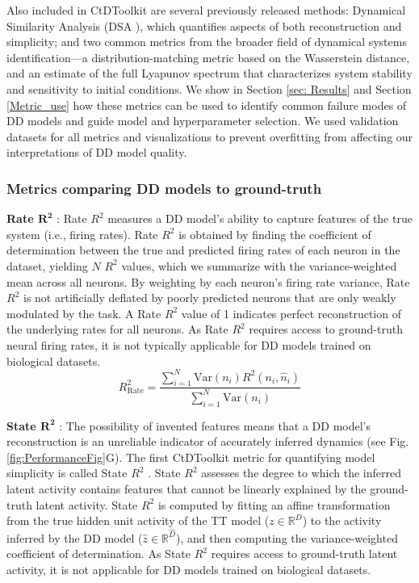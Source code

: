 \documentclass{article}
\begin{document}
Also included in CtDToolkit are several previously released methods: Dynamical Similarity Analysis (DSA \cite{ostrow_dsa}), which quantifies aspects of both reconstruction and simplicity; and two common metrics from the broader field of dynamical systems identification—a distribution-matching metric based on the Wasserstein distance, and an estimate of the full Lyapunov spectrum that characterizes system stability and sensitivity to initial conditions. We show in Section \ref{sec: Results} and Section \ref{Metric_use} how these metrics can be used to identify common failure modes of DD models and guide model and hyperparameter selection. We used validation datasets for all metrics and visualizations to prevent overfitting from affecting our interpretations of DD model quality.

\subsubsection{Metrics comparing DD models to ground-truth \label{section:GTMetrics}}
\textbf{Rate $\boldsymbol{R^2}$} :
Rate $R^2$ measures a DD model's ability to capture features of the true system (i.e., firing rates). Rate $R^2$ is obtained by finding the coefficient of determination between the true and predicted firing rates of each neuron in the dataset, yielding $N$ $R^2$ values, which we summarize with the variance-weighted mean across all neurons. By weighting by each neuron's firing rate variance, Rate $R^2$ is not artificially deflated by poorly predicted neurons that are only weakly modulated by the task. A Rate $R^2$ value of 1 indicates perfect reconstruction of the underlying rates for all neurons. As Rate $R^2$ requires access to ground-truth neural firing rates, it is not typically applicable for DD models trained on biological datasets.
\begin{equation}
R^2_{\text{Rate}} = \frac{\sum_{i=1}^{N} \text{Var}(n_i) R^2(n_i, \hat{n}_i)}{\sum_{i=1}^{N} \text{Var}(n_i)}
\end{equation}

\textbf{State $\boldsymbol{R^{2}}$} :
The possibility of invented features means that a DD model’s reconstruction is an unreliable indicator of accurately inferred dynamics (see Fig. \ref{fig:PerformanceFig}G). The first CtDToolkit metric for quantifying model simplicity is called State $R^{2}$ \cite{sedler_expressive_2022}. State $R^{2}$ assesses the degree to which the inferred latent activity contains features that cannot be linearly explained by the ground-truth latent activity. State $R^{2}$ is computed by fitting an affine transformation from the true hidden unit activity of the TT model ($z \in \mathbb{R}^{D}$) to the activity inferred by the DD model ($\hat{z} \in \mathbb{R}^{\hat{D}}$), and then computing the variance-weighted coefficient of determination. As State $R^{2}$ requires access to ground-truth latent activity, it is not applicable for DD models trained on biological datasets.
\end{document}
